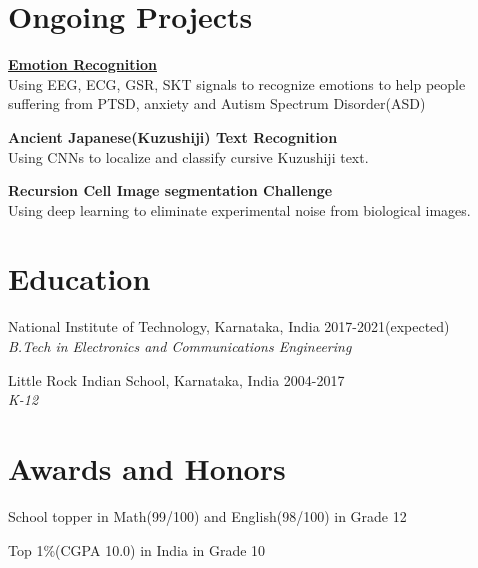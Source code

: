 \documentclass[letterpaper]{article}
\renewenvironment{itemize}{
  \begin{list}{}{
    \setlength{\leftmargin}{1.5em}
  }
}{
  \end{list}
}
\begin{document}
\section*{Ongoing Projects}
  \begin{itemize}
    \item 
    \href{https://github.com/rshwndsz/emotion-recognition}{\textbf{Emotion Recognition}}\\
    Using EEG, ECG, GSR, SKT signals to recognize emotions to help people suffering from PTSD, anxiety and Autism Spectrum Disorder(ASD)
    \item 
    \textbf{Ancient Japanese(Kuzushiji) Text Recognition}\\
    Using CNNs to localize and classify cursive Kuzushiji text.
    \item 
    \textbf{Recursion Cell Image segmentation Challenge}\\
    Using deep learning to eliminate experimental noise from biological images.
  \end{itemize}

\section*{Education}
  \begin{itemize}
    \item National Institute of Technology, Karnataka, India\hfill 
    2017-2021(expected)
    \\
    {\sl B.Tech in Electronics and Communications Engineering}

    \item Little Rock Indian School, Karnataka, India\hfill
    2004-2017
    \\
    {\sl K-12}\hfill
  \end{itemize}

\section*{Awards and Honors}
\begin{itemize}
  \item School topper in Math(99/100) and English(98/100) in Grade 12
  \item Top 1\%(CGPA 10.0) in India in Grade 10
\end{itemize}

\end{document}
